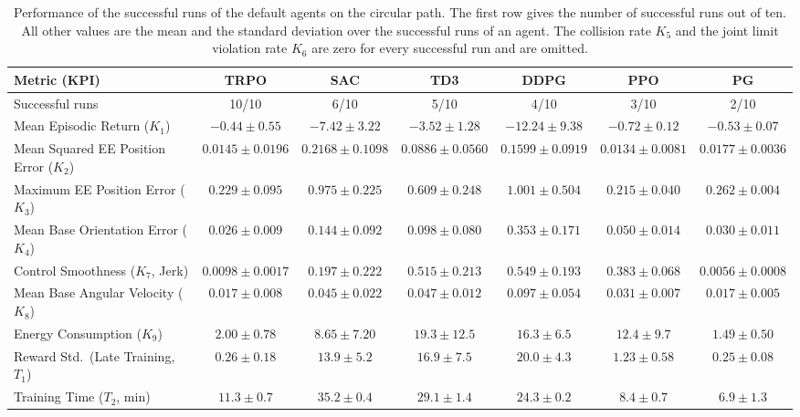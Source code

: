 \documentclass{ieeeaccess}
\begin{document}
\begin{table}[!t]
\centering
\caption{Performance of the successful runs of the default agents on the circular path. The first row gives
the number of successful runs out of ten. All other values are the mean and the standard deviation over the
successful runs of an agent. The collision rate $K_5$ and the joint limit violation rate $K_6$ are zero for
every successful run and are omitted.}
\label{tab:kpi_comp}
\renewcommand{\arraystretch}{1.2}
\setlength{\tabcolsep}{2.4pt}
\footnotesize
\begin{tabular}{lcccccc}
\toprule
\textbf{Metric (KPI)} & \textbf{TRPO} & \textbf{SAC} & \textbf{TD3} & \textbf{DDPG} & \textbf{PPO} &
  \textbf{PG} \\
\midrule
Successful runs & 10/10 & 6/10 & 5/10 & 4/10 & 3/10 & 2/10 \\
Mean Episodic Return ($K_1$) & $-0.44 \pm 0.55$ & $-7.42 \pm 3.22$ & $-3.52 \pm 1.28$ &
  $-12.24 \pm 9.38$ & $-0.72 \pm 0.12$ & $-0.53 \pm 0.07$ \\
Mean Squared EE Position Error ($K_2$) & $0.0145 \pm 0.0196$ & $0.2168 \pm 0.1098$ &
  $0.0886 \pm 0.0560$ & $0.1599 \pm 0.0919$ & $0.0134 \pm 0.0081$ & $0.0177 \pm 0.0036$ \\
Maximum EE Position Error ($K_3$) & $0.229 \pm 0.095$ & $0.975 \pm 0.225$ & $0.609 \pm 0.248$ &
  $1.001 \pm 0.504$ & $0.215 \pm 0.040$ & $0.262 \pm 0.004$ \\
Mean Base Orientation Error ($K_4$) & $0.026 \pm 0.009$ & $0.144 \pm 0.092$ & $0.098 \pm 0.080$ &
  $0.353 \pm 0.171$ & $0.050 \pm 0.014$ & $0.030 \pm 0.011$ \\
Control Smoothness ($K_7$, Jerk) & $0.0098 \pm 0.0017$ & $0.197 \pm 0.222$ & $0.515 \pm 0.213$ &
  $0.549 \pm 0.193$ & $0.383 \pm 0.068$ & $0.0056 \pm 0.0008$ \\
Mean Base Angular Velocity ($K_8$) & $0.017 \pm 0.008$ & $0.045 \pm 0.022$ & $0.047 \pm 0.012$ &
  $0.097 \pm 0.054$ & $0.031 \pm 0.007$ & $0.017 \pm 0.005$ \\
Energy Consumption ($K_9$) & $2.00 \pm 0.78$ & $8.65 \pm 7.20$ & $19.3 \pm 12.5$ & $16.3 \pm 6.5$ &
  $12.4 \pm 9.7$ & $1.49 \pm 0.50$ \\
Reward Std.\ (Late Training, $T_1$) & $0.26 \pm 0.18$ & $13.9 \pm 5.2$ & $16.9 \pm 7.5$ &
  $20.0 \pm 4.3$ & $1.23 \pm 0.58$ & $0.25 \pm 0.08$ \\
Training Time ($T_2$, min) & $11.3 \pm 0.7$ & $35.2 \pm 0.4$ & $29.1 \pm 1.4$ & $24.3 \pm 0.2$ &
  $8.4 \pm 0.7$ & $6.9 \pm 1.3$ \\
\bottomrule
\end{tabular}
\end{table}
\end{document}

